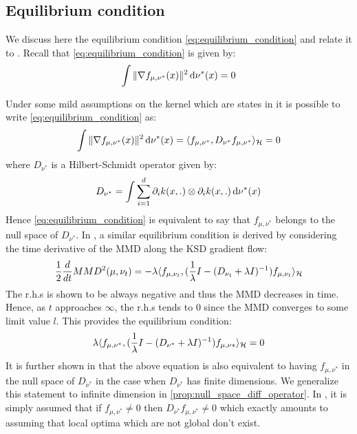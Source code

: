 \subsection{Equilibrium condition}\label{subsec:equilibrium_condition}
We discuss here the equilibrium condition \cref{eq:equilibrium_condition} and relate it to \cite[Assumption A]{Mroueh:2019}. Recall that \cref{eq:equilibrium_condition} is given by:
\[
\int \Vert \nabla f_{\mu,\nu^{*}}(x) \Vert^2 \mathop{}\!\mathrm{d} \nu^{*}(x) = 0
\]

Under some mild  assumptions on the kernel which are states in \cite[Appendix C.1]{Mroueh:2019} it is possible to write \cref{eq:equilibrium_condition} as:
\[
\int \Vert \nabla f_{\mu,\nu^{*}}(x) \Vert^2 \mathop{}\!\mathrm{d} \nu^{*}(x) = \langle f_{\mu,\nu^{*}} ,   D_{\nu^{*}}  f_{\mu,\nu^{*}}\rangle_{{{\mathcal H}}}  = 0
\]
where $D_{\nu^{*}}$ is a Hilbert-Schmidt operator given by: %
\[
D_{\nu^{*}} = \int \sum_{i=1}^d \partial_i k(x,.)\otimes \partial_i k(x,.) \mathop{}\!\mathrm{d} \nu^{*}(x)
\]
Hence \cref{eq:equilibrium_condition} is equivalent to say that $f_{\mu,\nu^{*}}$ belongs to the null space of $D_{\nu^{*}}$. In \cite[Theorem 2]{Mroueh:2019}, a similar equilibrium condition is derived by considering the time derivative of the MMD along the KSD gradient flow:
\[
\frac{1}{2} \frac{d}{dt} MMD^2(\mu,\nu_t) = - \lambda \langle f_{\mu,\nu_t}, (\frac{1}{\lambda}I - (D_{\nu_t} +\lambda I )^{-1})f_{\mu,\nu_t} \rangle_{{{\mathcal H}}} 
\] 
The r.h.s is shown to be always negative and thus the MMD decreases in time. Hence, as $t$ approaches $\infty$, the r.h.s tends to $0$ since the MMD converges to some limit value $l$. This provides the equilibrium condition:
\[
\lambda \langle f_{\mu,\nu^{*}}, (\frac{1}{\lambda}I - (D_{\nu^{*}} +\lambda I )^{-1})f_{\mu,\nu{*}} \rangle_{{{\mathcal H}}} = 0
\] 
It is further shown in  \cite[Lemma 2]{Mroueh:2019} that the above equation is also equivalent to having $f_{\mu,\nu^{*}}$ in the null space of $D_{\nu^{*}}$ in the case when $D_{\nu^{*}}$ has finite dimensions. We generalize this statement to infinite dimension in \cref{prop:null_space_diff_operator}. 
In \cite[Assumption A]{Mroueh:2019}, it is simply assumed that if $f_{\mu,\nu^{*}} \neq0$ then  $D_{\nu^{*}} f_{\mu,\nu^{*}} \neq 0 $ which exactly amounts to assuming that local optima which are not global don't exist.
 
